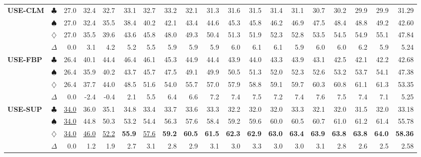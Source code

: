 \documentclass{article}
\begin{document}
\begin{table}[t]
{\begin{tabular}{lcrrrrrrrrrrrrrrrrr}
             \multirow{4}{*}{\textbf{USE-CLM}} & $\clubsuit$ & 27.0 & 32.4 & 32.7 & 33.1 & 32.7 & 33.2 & 32.1 & 31.3 & 31.6 & 31.5 & 31.4 & 31.1 & 30.7 & 30.2 & 29.9 & 29.9 & 31.29\\
             & $\spadesuit$ &27.0 & 32.4 & 35.5 & 38.4 & 40.2 & 42.1 & 43.4 & 44.6 & 45.3 & 45.8 & 46.2 & 46.9 & 47.5 & 48.4 & 48.8 & 49.2 & 42.60\\
             & $\diamondsuit$ & 27.0 & 35.5 & 39.6 & 43.6 & 45.8 & 48.0 & 49.3 & 50.4 & 51.3 & 51.9 & 52.3 & 52.8 & 53.5 & 54.5 & 54.9 & 55.1 & 47.84\\
             & $\Delta$ & 0.0 & 3.1 & 4.2 & 5.2 & 5.5 & 5.9 & 5.9 & 5.9 & 6.0 & 6.1 & 6.1 & 5.9 & 6.0 & 6.0 & 6.2 & 5.9 & 5.24\\

             \cmidrule(lr){1-19}

             \multirow{4}{*}{\textbf{USE-FBP}} & $\clubsuit$ & 26.4 & 40.1 & 44.4 & 46.4 & 46.1 & 45.3 & 44.9 & 44.4 & 43.9 & 44.0 & 43.3 & 43.9 & 43.1 & 42.5 & 42.1 & 42.2 & 42.68\\
             & $\spadesuit$ & 26.4 & 35.9 & 40.2 & 43.7 & 45.7 & 47.5 & 49.1 & 49.9 & 50.5 & 51.3 & 52.0 & 52.3 & 52.6 & 53.2 & 53.7 & 54.1 & 47.38\\
             & $\diamondsuit$ &26.4 & 37.7 & 44.0 & 48.5 & 51.6 & 54.0 & 55.7 & 57.0 & 57.9 & 58.8 & 59.1 & 59.7 & 60.3 & 60.8 & 61.1 & 61.3 & 53.35 \\
             & $\Delta$ & 0.0 & -2.4 & -0.4 & 2.1 & 5.5 & 6.4 & 6.6 & 7.2 & 7.4 & 7.5 & 7.2 & 7.4 & 7.6 & 7.5 & 7.4 & 7.1 & 5.25\\

            \cmidrule(lr){1-19}

             \multirow{4}{*}{\textbf{USE-SUP}} & $\clubsuit$ & \underline{34.0} & 36.0 & 35.1 & 34.8 & 33.4 & 33.7 & 33.6 & 33.3 & 32.2 & 32.0 & 32.0 & 33.3 & 32.1 & 32.0 & 31.5 & 32.0 & 33.18\\
             & $\spadesuit$ & \underline{34.0} & 44.8 & 50.3 & 53.2 & 54.4 & 56.3 & 57.6 & 58.4 & 59.2 & 59.6 & 60.0 & 60.5 & 60.7 & 61.0 & 61.2 & 61.4 & 55.78\\
             & $\diamondsuit$ & \underline{34.0} & \underline{46.0} & \underline{52.2} & \textbf{55.9} & \underline{57.6} & \textbf{59.2} & \textbf{60.5} & \textbf{61.5} & \textbf{62.3} & \textbf{62.9} & \textbf{63.0} & \textbf{63.4} & \textbf{63.9} & \textbf{63.8} & \textbf{63.8} & \textbf{64.0} & \textbf{58.36}\\
             & $\Delta$ & 0.0 & 1.2 & 1.9 & 2.7 & 3.1 & 2.8 & 2.9 & 3.1 & 3.0 & 3.3 & 3.0 & 3.0 & 3.1 & 2.8 & 2.6 & 2.5 & 2.58\\


\end{tabular}}
\end{table}
\end{document}
